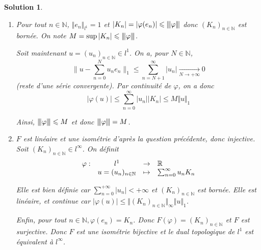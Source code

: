 \documentclass[12pt]{article}
\newtheorem{solution}{Solution}[section]
\theoremstyle{remark}
\newcommand{\N}{\mathbb{N}} \newcommand{\Z}{\mathbb{Z}}
\newcommand{\vertiii}[1]{{\left\vert\kern-0.25ex\left\vert\kern-0.25ex\left\vert{}#1
\right\vert\kern-0.25ex\right\vert\kern-0.25ex\right\vert}}
\newcommand{\function}[5]{
	$$
	\begin{array}{rccl}
		#1: & #2 & \to & #3 \\
		& #4 & \mapsto & #5
	\end{array}
	$$
}
\begin{document}
\begin{solution}
	\phantom{}
	\begin{enumerate}
		\item Pour tout $n\in\N$, $\Vert e_{n}\Vert_{l^{1}}=1$ et $\vert K_{n}\vert=\vert\varphi(e_{n})\vert\leqslant\vertiii{\varphi}$ donc $(K_{n})_{n\in\N}$ est bornée. On note $M=\sup\vert K_{n}\vert\leqslant\vertiii{\varphi}$.
		
		Soit maintenant $u=(u_{n})_{n\in\N}\in l^{1}$. On a, pour $N\in\N$, 
		$$\Biggl\lVert u-\sum_{n=0}^{N}u_{n}e_{n}\Biggr\rVert_{1}\leqslant\sum_{n=N+1}^{\infty}\vert u_{n}\vert\xrightarrow[N\to+\infty]{}0$$
		(reste d'une série convergente). Par continuité de $\varphi$, on a donc 
		$$\vert \varphi(u)\vert\leqslant\sum_{n=0}^{\infty}\vert u_{n}\vert \vert K_{n}\vert\leqslant M\Vert u\Vert_{1}$$

		Ainsi, $\vertiii{\varphi}\leqslant M$ et donc $\vertiii{\varphi}=M$.

		\item $F$ est linéaire et une isométrie d'après la question précédente, donc injective. Soit $(K_{n})_{n\in\N}\in l^{\infty}$. On définit \function{\varphi}{l^1}{\R}{u=(u_n)_{n\in\N}}{\sum_{n=0}^{\infty}u_{n}K_{n}}
		Elle est bien définie car $\sum_{n=0}^{+\infty}\vert u_{n}\vert<+\infty$ et $(K_{n})_{n\in\N}$ est bornée. Elle est linéaire, et continue car $\vert\varphi(u)\vert\leqslant\Vert(K_{n})_{n\in\N}\Vert_{\infty}\Vert u\Vert_{1}$.

		Enfin, pour tout $n\in\N,\varphi(e_{n})=K_{n}$. Donc $F(\varphi)=(K_{n})_{n\in\N}$ et $F$ est surjective. Donc $F$ est une isométrie bijective et le dual topologique de $l^{1}$ est équivalent à $l^{\infty}$.
	\end{enumerate}
\end{solution}
\end{document}
